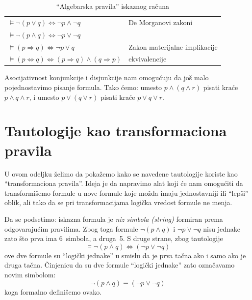 \begin{table}[!h]
\begin{tabular}{ll}
    $\vDash \lnot(p \lor q) \Leftrightarrow \lnot p \land \lnot q$ & De Morganovi zakoni \\
    $\vDash \lnot(p \land q) \Leftrightarrow \lnot p \lor \lnot q$ & \hphantom{De Morganovi zakoni}\llap{\dots}\\
    \hline
    $\vDash (p \Rightarrow q) \Leftrightarrow \lnot p \lor q$ & Zakon materijalne implikacije\\
    $\vDash (p \Leftrightarrow q) \Leftrightarrow (p \Rightarrow q) \land (q \Rightarrow p)$ & \hphantom{Zakon materijalne}\llap{\dots} ekvivalencije\\
\end{tabular}
\caption{\enquote{Algebarska pravila} iskaznog ra\v cuna}
\label{ft03.tab.tautologije}
\end{table}

\begin{CONVENTION}\label{ft03.convention.assoc}
  Asocijativnost konjunkcije i disjunkcije nam omogu\'cuju da jo\v s malo pojednostavimo pisanje formula. Tako \'cemo:
  umesto $p \land (q \land r)$ pisati kra\'ce $p \land q \land r$, i
  umesto $p \lor (q \lor r)$ pisati kra\'ce $p \lor q \lor r$.
\end{CONVENTION}

\clearpage

\section{Tautologije kao transformaciona pravila}

U ovom odeljku \v zelimo da poka\v zemo kako se navedene tautologije koriste kao \enquote{transformaciona pravila}.
Ideja je da napravimo alat koji \'ce nam omogu\'citi da transformi\v semo formule u nove formule koje mo\v zda
imaju jednostavniji ili \enquote{lep\v si} oblik, ali tako da se pri transformacijama logi\v cka vredost formule ne menja.

Da se podsetimo: iskazna formula je \emph{niz simbola (string)} formiran prema odgovaraju\'cim pravilima. Zbog toga
formule $\lnot(p \land q)$ i $\lnot p \lor \lnot q$ nisu jednake zato \v sto prva ima 6~simbola, a druga~5.
S druge strane, zbog tautologije
$$
  \vDash \lnot(p \land q) \Leftrightarrow (\lnot p \lor \lnot q)
$$
ove dve formule su \enquote{logi\v cki jednake} u smislu da je prva ta\v cna ako i samo ako je druga
ta\v cna. \v Cinjenicu da su dve formule \enquote{logi\v cki jednake} zato ozna\v cavamo novim simbolom:
$$
  \lnot(p \land q) \equiv (\lnot p \lor \lnot q)
$$
koga formalno defini\v semo ovako.

